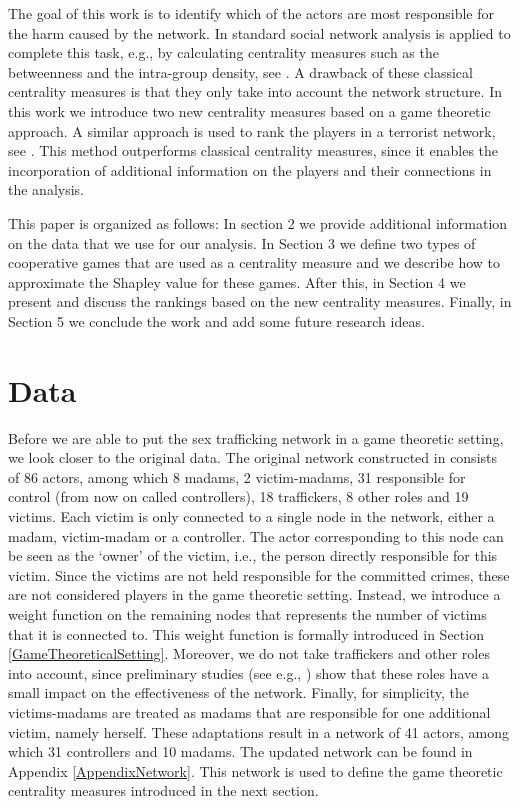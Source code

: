 \documentclass[10p]{article}
\theoremstyle{definition}
\theoremstyle{definition}
\begin{document}
The goal of this work is to identify which of the actors are most responsible for the harm caused by the network. In \cite{mancuso2014not} standard social network analysis is applied to complete this task, e.g., by calculating centrality measures such as the betweenness and the intra-group density, see \cite{wasserman1994social}. A drawback of these classical centrality measures is that they only take into account the network structure. In this work we introduce two new centrality measures based on a game theoretic approach. A similar approach is used to rank the players in a terrorist network, see \cite{lindelauf2011game, husslage2015ranking, campen2018new}. This method outperforms classical centrality measures, since it enables the incorporation of additional information on the players and their connections in the analysis.

This paper is organized as follows: In section 2 we provide additional information on the data that we use for our analysis. In Section 3 we define two types of cooperative games that are used as a centrality measure and we describe how to approximate the Shapley value for these games. After this, in Section 4 we present and discuss the rankings based on the new centrality measures. Finally, in Section 5 we conclude the work and add some future research ideas.

\section{Data}
Before we are able to put the sex trafficking network in a game theoretic setting, we look closer to the original data. The original network constructed in \cite{mancuso2014not} consists of 86 actors, among which 8 madams, 2 victim-madams, 31 responsible for control (from now on called controllers), 18 traffickers, 8 other roles and 19 victims. Each victim is only connected to a single node in the network, either a madam, victim-madam or a controller. The actor corresponding to this node can be seen as the `owner' of the victim, i.e., the person directly responsible for this victim. Since the victims are not held responsible for the committed crimes, these are not considered players in the game theoretic setting. Instead, we introduce a weight function on the remaining nodes that represents the number of victims that it is connected to. This weight function is formally introduced in Section \ref{GameTheoreticalSetting}. Moreover, we do not take traffickers and other roles into account, since preliminary studies (see e.g., \cite{mancuso2014not}) show that these roles have a small impact on the effectiveness of the network. Finally, for simplicity, the victims-madams are treated as madams that are responsible for one additional victim, namely herself. These adaptations result in a network of 41 actors, among which 31 controllers and 10 madams. The updated network can be found in Appendix \ref{AppendixNetwork}. This network is used to define the game theoretic centrality measures introduced in the next section.
\end{document}

